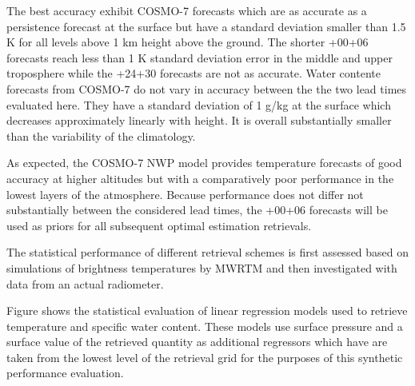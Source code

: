     The best accuracy exhibit COSMO-7 forecasts which are as accurate as
    a persistence forecast at the surface but have a standard deviation smaller
    than 1.5 K for all levels above 1 km height above the ground. The shorter
    +00+06 forecasts reach less than 1 K standard deviation error in the middle
    and upper troposphere while the +24+30 forecasts are not as accurate.
    Water contente forecasts from COSMO-7 do not vary in accuracy between the
    the two lead times evaluated here. They have a standard deviation of 1 g/kg
    at the surface which decreases approximately linearly with height. It is
    overall substantially smaller than the variability of the climatology.

    As expected, the COSMO-7 NWP model provides temperature forecasts of good
    accuracy at higher altitudes but with a comparatively poor performance in
    the lowest layers of the atmosphere. Because performance does not differ
    not substantially between the considered lead times, the +00+06 forecasts
    will be used as priors for all subsequent optimal estimation retrievals.

        {}

\stopsection


\startsection[title={Statistical Retrieval Performance}]

    The statistical performance of different retrieval schemes is first
    assessed based on simulations of brightness temperatures by MWRTM and then
    investigated with data from an actual radiometer.

\startsubsection[title={Linear Regression Retrievals}]

    Figure  shows the statistical evaluation of linear
    regression models used to retrieve temperature and specific water content.
    These models use surface pressure and a surface value of the retrieved
    quantity as additional regressors which have are taken from the lowest
    level of the retrieval grid for the purposes of this synthetic performance
    evaluation.

